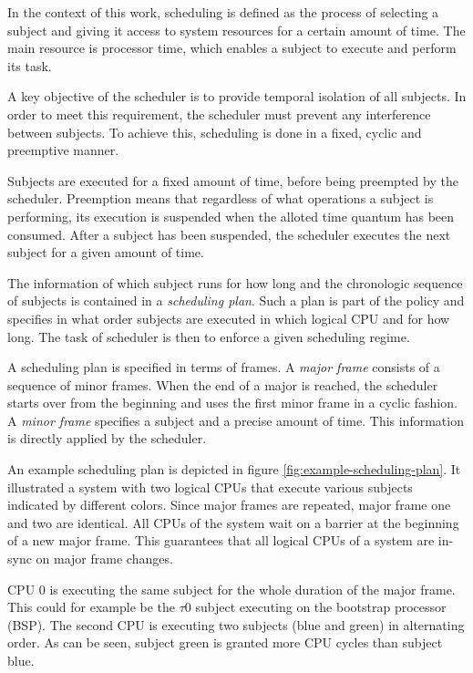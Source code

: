 In the context of this work, scheduling is defined as the process of selecting
a subject and giving it access to system resources for a certain amount of time.
The main resource is processor time, which enables a subject to execute and
perform its task.

A key objective of the scheduler is to provide temporal isolation of all
subjects. In order to meet this requirement, the scheduler must prevent any
interference between subjects. To achieve this, scheduling is done in a fixed,
cyclic and preemptive manner.

Subjects are executed for a fixed amount of time, before being preempted by the
scheduler. Preemption means that regardless of what operations a subject is
performing, its execution is suspended when the alloted time quantum has been
consumed. After a subject has been suspended, the scheduler executes the next
subject for a given amount of time.

The information of which subject runs for how long and the chronologic sequence
of subjects is contained in a \emph{scheduling plan}.
Such a plan is part of the policy and specifies in what order subjects are
executed in which logical CPU and for how long. The task of scheduler is then to
enforce a given scheduling regime.

A scheduling plan is specified in terms of frames. A \emph{major frame}
 consists of a sequence of minor frames. When the end of a
major is reached, the scheduler starts over from the beginning and uses the
first minor frame in a cyclic fashion. A \emph{minor frame}
specifies a subject and a precise amount of time. This information is directly
applied by the scheduler.

An example scheduling plan is depicted in figure
\ref{fig:example-scheduling-plan}. It illustrated a system with two logical CPUs
that execute various subjects indicated by different colors. Since major frames
are repeated, major frame one and two are identical. All CPUs of the system
wait on a barrier at the beginning of a new major frame. This guarantees that
all logical CPUs of a system are in-sync on major frame changes.

CPU 0 is executing the same subject for the whole duration of the major frame.
This could for example be the $\tau$0 subject executing on the bootstrap
processor (BSP). The second CPU is executing two subjects (blue and green) in
alternating order. As can be seen, subject green is granted more CPU cycles than
subject blue.

